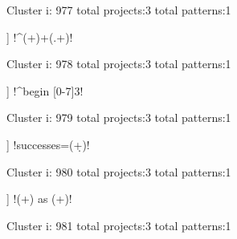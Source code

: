 Cluster i: 977
total projects:3
total patterns:1
\begin{multicols}{1}
\begin{description}[noitemsep,topsep=0pt]
\item [[3] ] \cverb!^(\w+)\s+(.+)!
\end{description}
\end{multicols}







Cluster i: 978
total projects:3
total patterns:1
\begin{multicols}{1}
\begin{description}[noitemsep,topsep=0pt]
\item [[3] ] \cverb!^begin [0-7]{3}!
\end{description}
\end{multicols}







Cluster i: 979
total projects:3
total patterns:1
\begin{multicols}{1}
\begin{description}[noitemsep,topsep=0pt]
\item [[3] ] \cverb!successes=(\d+)!
\end{description}
\end{multicols}







Cluster i: 980
total projects:3
total patterns:1
\begin{multicols}{1}
\begin{description}[noitemsep,topsep=0pt]
\item [[3] ] \cverb!(\w+) as (\w+)!
\end{description}
\end{multicols}







Cluster i: 981
total projects:3
total patterns:1
\begin{multicols}{1}
\end{multicols}







